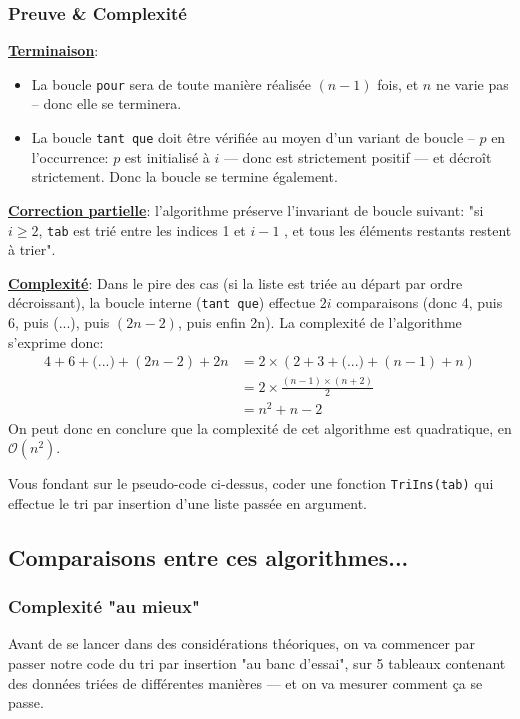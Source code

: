 \documentclass[12pt]{article}
\begin{document}
	\subsubsection*{Preuve \& Complexité}
	\textbf{\uline{Terminaison}}: 
	\begin{itemize}
		\item La boucle \texttt{pour} sera de toute manière réalisée $(n-1)$ fois, et $n$ ne varie pas -- donc elle se terminera.
		\item La boucle \texttt{tant que} doit être vérifiée au moyen d'un variant de boucle -- $p$ en l'occurrence: $p$ est initialisé à $i$ --- donc est strictement positif --- et décroît strictement. Donc la boucle se termine également.
	\end{itemize}
	
	\textbf{\uline{Correction partielle}}: l'algorithme préserve l'invariant de boucle suivant: "si $i \geq 2$, \texttt{tab} est trié entre les indices 1 et $i - 1$ , et tous les éléments restants restent à trier".
	
	\textbf{\uline{Complexité}}: Dans le pire des cas (si la liste est triée au départ par ordre décroissant), la boucle interne (\texttt{tant que}) effectue $2i$ comparaisons (donc 4, puis 6, puis (...), puis $(2n - 2)$, puis enfin 2n). La complexité de l'algorithme s'exprime donc:
	\begin{align*}
	4 + 6 + \text{(...)} + (2n-2) + 2n &= 2 \times (2 + 3 + \text{(...)} + (n-1) + n) \\
	&= 2 \times \frac{(n-1)\times (n+2)}{2} \\
	&= n^2 + n - 2
	\end{align*}
	On peut donc en conclure que la complexité de cet algorithme est quadratique, en $\mathcal{O}(n^2)$.
	
	\begin{MonExo}
		Vous fondant sur le pseudo-code ci-dessus, coder une fonction \texttt{TriIns(tab)} qui effectue le tri par insertion d'une liste passée en argument.
	\end{MonExo}
	\begin{MaReponse}
	\end{MaReponse}
	
	\subsection{Comparaisons entre ces algorithmes...}
	\subsubsection*{Complexité "au mieux"}
	Avant de se lancer dans des considérations théoriques, on va commencer par passer notre code du tri par insertion "au banc d'essai", sur 5 tableaux contenant des données triées de différentes manières --- et on va mesurer comment ça se passe.
	
\end{document}
